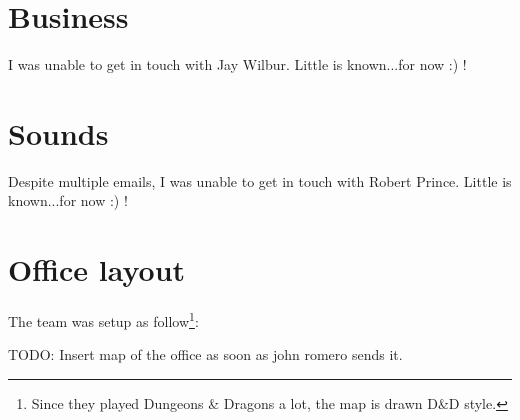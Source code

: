 \documentclass[book.tex]{subfiles}
\begin{document}
\section{Business}
I was unable to get in touch with Jay Wilbur. Little is known...for now :) !\\




\section{Sounds}
Despite multiple emails, I was unable to get in touch with Robert Prince. Little is known...for now :) !\\




\section{Office layout}
The team was setup as follow\footnote{Since they played Dungeons \& Dragons a lot, the map is drawn D\&D style.}:
\par
TODO: Insert map of the office as soon as john romero sends it.
\end{document}
